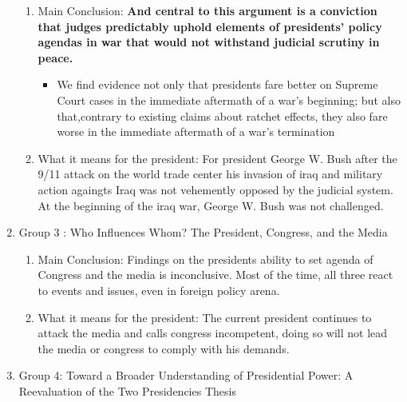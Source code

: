 \documentclass{article}
\begin{document}
\begin{enumerate}
    \begin{enumerate}
        \item \color{red} Main Conclusion: \color{black} \textbf{And central to this argument is a conviction that judges predictably uphold elements of presidents’ policy agendas in war that would not withstand judicial scrutiny in peace.}
        \begin{itemize}
            \item  We find evidence not only that presidents fare better on Supreme Court cases in the immediate aftermath of a war’s beginning; but also that,contrary to existing claims about ratchet effects, they also fare worse in the immediate aftermath of a war’s termination
        \end{itemize}
       
        \item \color{red}What it means for the president: \color{black} For president George W. Bush after the 9/11 attack on the world trade center his invasion of iraq and military action againgts Iraq was not vehemently opposed by the judicial system. At the beginning of the iraq war, George W. Bush was not challenged. 
    \end{enumerate}
    \color{black}
    \item Group 3 : Who Influences Whom? The President, Congress, and the Media 
    
    \begin{enumerate}
        \item \color{red} Main Conclusion: \color{black} Findings on the presidents ability to set agenda of Congress and the media is inconclusive. 
Most of the time, all three react to events and issues, even in foreign policy arena. 
        \item \color{red} What it means for the president: \color{black} The current president continues to attack the media and calls congress incompetent, doing so will not lead the media or congress to comply with his demands. 
    \end{enumerate}
    \color{black}
    \item Group 4: Toward a Broader Understanding of Presidential Power: A Reevaluation of the Two Presidencies
Thesis
    

\end{enumerate}
\end{document}
